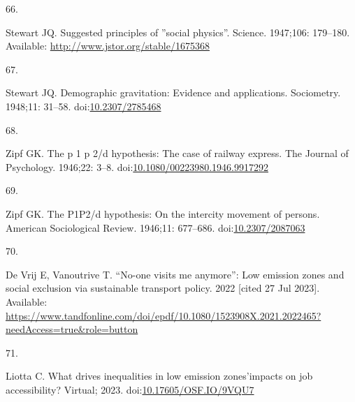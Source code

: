 \documentclass[10pt,letterpaper]{article}
\newlength{\cslhangindent}
\newlength{\csllabelwidth}
\newlength{\cslentryspacingunit} %
\newenvironment{CSLReferences}[2] %
 {%
  \setlength{\parindent}{0pt}
  \ifodd #1
  \let\oldpar\par
  \def\par{\hangindent=\cslhangindent\oldpar}
  \fi
  \setlength{\parskip}{#2\cslentryspacingunit}
 }%
 {}
\newcommand{\CSLLeftMargin}[1]{\parbox[t]{\csllabelwidth}{#1}}
\newcommand{\CSLRightInline}[1]{\parbox[t]{\linewidth - \csllabelwidth}{#1}\break}
\providecommand{\DIFaddbegin}{} %
\providecommand{\DIFaddend}{} %
\providecommand{\DIFdelbegin}{} %
\providecommand{\DIFdelend}{} %
\newcommand{\DIFscaledelfig}{0.5}
\newlength{\DIFdelgraphicswidth} %
\newlength{\DIFdelgraphicsheight} %
\newcommand{\DIFaddincludegraphics}[2][]{{\color{blue}\fbox{\DIFOincludegraphics[#1]{#2}}}} %
\newcommand{\DIFdelincludegraphics}[2][]{%
\sbox{\DIFdelgraphicsbox}{\DIFOincludegraphics[#1]{#2}}%
\settoboxwidth{\DIFdelgraphicswidth}{\DIFdelgraphicsbox} %
\settoboxtotalheight{\DIFdelgraphicsheight}{\DIFdelgraphicsbox} %
\scalebox{\DIFscaledelfig}{%
\parbox[b]{\DIFdelgraphicswidth}{\usebox{\DIFdelgraphicsbox}\\[-\baselineskip] \rule{\DIFdelgraphicswidth}{0em}}\llap{\resizebox{\DIFdelgraphicswidth}{\DIFdelgraphicsheight}{%
\setlength{\unitlength}{\DIFdelgraphicswidth}%
\begin{picture}(1,1)%
\thicklines\linethickness{2pt} %
{\color[rgb]{1,0,0}\put(0,0){\framebox(1,1){}}}%
{\color[rgb]{1,0,0}\put(0,0){\line( 1,1){1}}}%
{\color[rgb]{1,0,0}\put(0,1){\line(1,-1){1}}}%
\end{picture}%
}\hspace*{3pt}}} %
} %
\DeclareRobustCommand{\DIFaddbegin}{\DIFOaddbegin \let\includegraphics\DIFaddincludegraphics} %
\DeclareRobustCommand{\DIFaddend}{\DIFOaddend \let\includegraphics\DIFOincludegraphics} %
\DeclareRobustCommand{\DIFdelbegin}{\DIFOdelbegin \let\includegraphics\DIFdelincludegraphics} %
\DeclareRobustCommand{\DIFdelend}{\DIFOaddend \let\includegraphics\DIFOincludegraphics} %
\begin{document}
\begin{CSLReferences}{0}{0}
\leavevmode{}%
\DIFdelbegin %
\DIFdelend \DIFaddbegin \CSLLeftMargin{66. }\DIFaddend %
\CSLRightInline{Stewart JQ. Suggested principles of ''social physics''.
Science. 1947;106: 179--180. Available:
\url{http://www.jstor.org/stable/1675368}}

\leavevmode{}%
\DIFdelbegin %
\DIFdelend \DIFaddbegin \CSLLeftMargin{67. }\DIFaddend %
\CSLRightInline{Stewart JQ. Demographic gravitation: Evidence and
applications. Sociometry. 1948;11: 31--58.
doi:\href{https://doi.org/10.2307/2785468}{10.2307/2785468}}

\leavevmode{}%
\DIFdelbegin %
\DIFdelend \DIFaddbegin \CSLLeftMargin{68. }\DIFaddend %
\CSLRightInline{Zipf GK. The p 1 p 2/d hypothesis: The case of railway
express. The Journal of Psychology. 1946;22: 3--8.
doi:\href{https://doi.org/10.1080/00223980.1946.9917292}{10.1080/00223980.1946.9917292}}

\leavevmode{}%
\DIFdelbegin %
\DIFdelend \DIFaddbegin \CSLLeftMargin{69. }\DIFaddend %
\CSLRightInline{Zipf GK. The P1P2/d hypothesis: On the intercity
movement of persons. American Sociological Review. 1946;11: 677--686.
doi:\href{https://doi.org/10.2307/2087063}{10.2307/2087063}}

\leavevmode{}%
\DIFdelbegin %
\DIFdelend \DIFaddbegin \CSLLeftMargin{70. }\DIFaddend %
\CSLRightInline{De Vrij E, Vanoutrive T. {``No-one visits me anymore''}:
Low emission zones and social exclusion via sustainable transport
policy. 2022 {[}cited 27 Jul 2023{]}. Available:
\url{https://www.tandfonline.com/doi/epdf/10.1080/1523908X.2021.2022465?needAccess=true\&role=button}}

\leavevmode{}%
\DIFdelbegin %
\DIFdelend \DIFaddbegin \CSLLeftMargin{71. }\DIFaddend %
\CSLRightInline{Liotta C. What drives inequalities in low emission
zones'impacts on job accessibility? Virtual; 2023.
doi:\href{https://doi.org/10.17605/OSF.IO/9VQU7}{10.17605/OSF.IO/9VQU7}}

\end{CSLReferences}

\nolinenumbers
\end{document}
